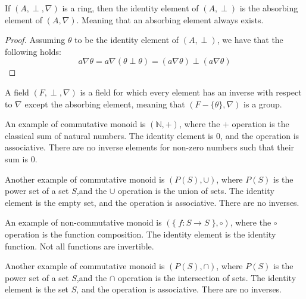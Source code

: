 \begin{lemma}
    If $(A, \perp, \nabla)$ is a ring, then the identity element of $(A, \perp)$ 
    is the absorbing element of $(A, \nabla)$. Meaning that an absorbing element
    always exists.
\end{lemma}
\begin{proof}
    Assuming $\theta$ to be the identity element of $(A, \perp)$, we have that the following 
    holds:
    $$ a \nabla \theta = a \nabla (\theta \perp \theta) = (a \nabla \theta) \perp (a \nabla \theta) $$
\end{proof}

\begin{definition}[Field]
    A field $(F, \perp, \nabla)$ is a field for which every element has an inverse 
    with respect to $\nabla$ except the absorbing element, meaning that $(F - \{\theta\}, \nabla)$
    is a group.
\end{definition}

\newpage

\begin{example}
    An example of commutative monoid is $(\mathbb{N}, +)$, where the $+$ operation is the 
    classical sum of natural numbers. The identity element is $0$, and the operation is 
    associative. There are no inverse elements for non-zero numbers such that 
    their sum is $0$. \\
\end{example}

\begin{example}
    Another example of commutative monoid is $(P(S), \cup)$, where $P(S)$ is the power set of a 
    set $S$,and the $\cup$ operation is the union of sets. The identity element is the empty set, 
    and the operation is associative. There are no inverses. \\
\end{example}

\begin{example}
    An example of non-commutative monoid is $(\{\;f : S \rightarrow S \;\}, \circ)$, where the 
    $\circ$ operation is the function composition. The identity element is the identity function. 
    Not all functions are invertible. \\
\end{example}

\begin{example}
    Another example of commutative monoid is $(P(S), \cap)$, where $P(S)$ is the power set of a 
    set $S$,and the $\cap$ operation is the intersection of sets. The identity element is the 
    set $S$, and the operation is associative. There are no inverses. \\
\end{example}

